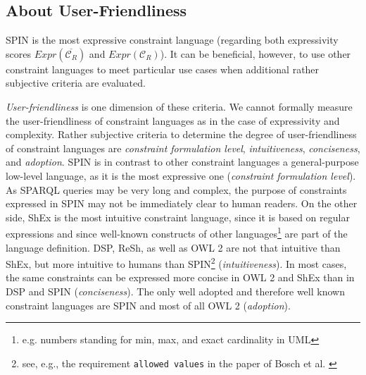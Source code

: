 \documentclass{llncs}
\newcommand{\ms}[1]{\texttt{#1}}
\def\checkmark{\tikz\fill[scale=0.4](0,.35) -- (.25,0) -- (1,.7) -- (.25,.15) -- cycle;}
\begin{document}
\subsection{About User-Friendliness}

SPIN is the most expressive constraint language (regarding both expressivity scores $Expr(\overline{\mathcal{C}_R})$ and $Expr(\mathcal{C}_R)$).
It can be beneficial, however, to use other constraint languages to meet particular use cases when additional rather subjective criteria are evaluated.

\emph{User-friendliness} is one dimension of these criteria.
We cannot formally measure the user-friendliness of constraint languages as in the case of expressivity and complexity. 
%
Rather subjective criteria to determine the degree of user-friendliness of constraint languages are 
\emph{constraint formulation level}, \emph{intuitiveness}, \emph{conciseness}, and \emph{adoption}.
SPIN is in contrast to other constraint languages a general-purpose low-level language, as it is the most expressive one (\emph{constraint formulation level}).
As SPARQL queries may be very long and complex, the purpose of constraints expressed in SPIN may not be immediately clear to human readers.
On the other side, ShEx is the most intuitive constraint language, since it is based on regular expressions and since well-known constructs of other languages\footnote{e.g. numbers standing for min, max, and exact cardinality in UML} are part of the language definition.
DSP, ReSh, as well as OWL 2 are not that intuitive than ShEx, but more intuitive to humans than SPIN\footnote{see, e.g., the requirement \ms{allowed values} in the paper of Bosch et al. \cite{BoschNolleAcarEckert2015}\label{footnoteIntuitivenessConciseness}} (\emph{intuitiveness}).
In most cases, the same constraints can be expressed more concise in OWL 2 and ShEx than in DSP and SPIN (\emph{conciseness}).
The only well adopted and therefore well known constraint languages are SPIN and most of all OWL 2 (\emph{adoption}).
\end{document}
